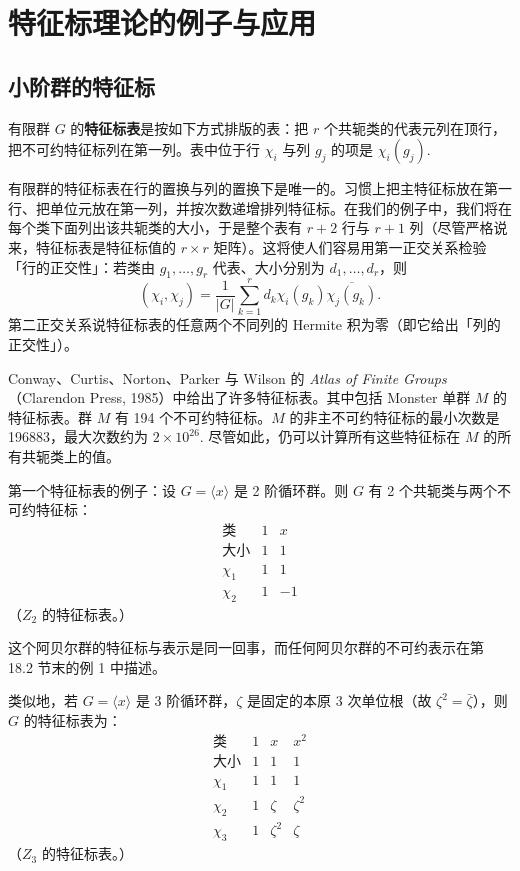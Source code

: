 
\setcounter{chapter}{18}

\chapter{特征标理论的例子与应用}

\section{小阶群的特征标}

有限群 \(G\) 的\textbf{特征标表}是按如下方式排版的表：把 \(r\) 个共轭类的代表元列在顶行，把不可约特征标列在第一列。表中位于行 \(\chi_i\) 与列 \(g_j\) 的项是 \(\chi_i(g_j)\).

有限群的特征标表在行的置换与列的置换下是唯一的。习惯上把主特征标放在第一行、把单位元放在第一列，并按次数递增排列特征标。在我们的例子中，我们将在每个类下面列出该共轭类的大小，于是整个表有 \(r+2\) 行与 \(r+1\) 列（尽管严格说来，特征标表是特征标值的 \(r \times r\) 矩阵）。这将使人们容易用第一正交关系检验「行的正交性」：若类由 \(g_1, \ldots, g_r\) 代表、大小分别为 \(d_1, \ldots, d_r\)，则
\[
(\chi_i, \chi_j) = \frac{1}{|G|}\sum_{k=1}^{r}d_k\chi_i(g_k)\overline{\chi_j(g_k)}.
\]
第二正交关系说特征标表的任意两个不同列的 Hermite 积为零（即它给出「列的正交性」）。

Conway、Curtis、Norton、Parker 与 Wilson 的 \textit{Atlas of Finite Groups}（Clarendon Press, 1985）中给出了许多特征标表。其中包括 Monster 单群 \(M\) 的特征标表。群 \(M\) 有 194 个不可约特征标。\(M\) 的非主不可约特征标的最小次数是 196883，最大次数约为 \(2 \times 10^{26}\). 尽管如此，仍可以计算所有这些特征标在 \(M\) 的所有共轭类上的值。

第一个特征标表的例子：设 \(G = \langle x\rangle\) 是 2 阶循环群。则 \(G\) 有 2 个共轭类与两个不可约特征标：
\[
\begin{array}{c|cc}
\text{类} & 1 & x\\ \hline
\text{大小} & 1 & 1\\
\chi_1 & 1 & 1\\
\chi_2 & 1 & -1
\end{array}
\]
（\(Z_2\) 的特征标表。）

这个阿贝尔群的特征标与表示是同一回事，而任何阿贝尔群的不可约表示在第 18.2 节末的例 1 中描述。

类似地，若 \(G = \langle x\rangle\) 是 3 阶循环群，\(\zeta\) 是固定的本原 3 次单位根（故 \(\zeta^2 = \bar\zeta\)），则 \(G\) 的特征标表为：
\[
\begin{array}{c|ccc}
\text{类} & 1 & x & x^2\\ \hline
\text{大小} & 1 & 1 & 1\\
\chi_1 & 1 & 1 & 1\\
\chi_2 & 1 & \zeta & \zeta^2\\
\chi_3 & 1 & \zeta^2 & \zeta
\end{array}
\]
（\(Z_3\) 的特征标表。）

